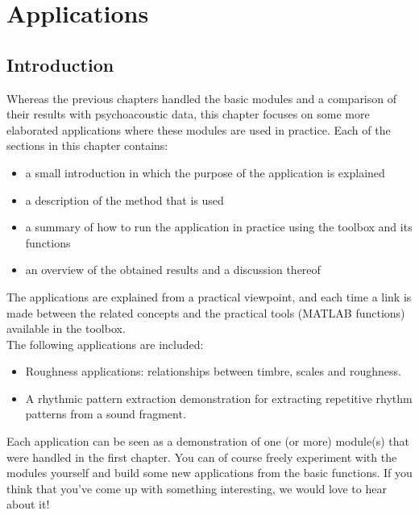 
\chapter{Applications}
\hypertarget{Chapter:ConceptsApplications}{}

\section{Introduction}

Whereas the previous chapters handled the basic modules and a
comparison of their results with psychoacoustic data, this chapter
focuses on some more elaborated applications where these modules
are used in practice. Each of the sections in this chapter
contains:
\begin{itemize}
\item a small introduction in which the purpose of the application is explained
\item a description of the method that is used
\item a summary of how to run the application in practice using
the toolbox and its functions
\item an overview of the obtained results and a discussion thereof
\end{itemize}
The applications are explained from a practical viewpoint, and
each time a link is made between the related concepts and the
practical tools (MATLAB functions) available in the toolbox.\\

The following applications are included:
\begin{itemize}
\item Roughness applications: relationships between timbre, scales and roughness.
\item A rhythmic pattern extraction demonstration for extracting
repetitive rhythm patterns from a sound fragment.
\end{itemize}
Each application can be seen as a demonstration of one (or more)
module(s) that were handled in the first chapter. You can of
course freely experiment with the modules yourself and build some
new applications from the basic functions. If you think that
you've come up with something interesting, we would love to hear
about it!




